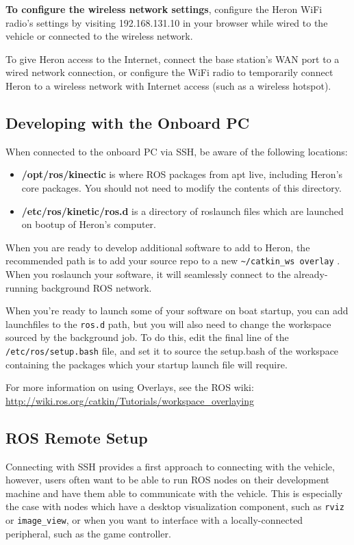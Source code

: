 \documentclass[]{clearpath-latex/clearpath-manual}
\begin{document}
\textbf{To configure the wireless network settings}, configure the Heron WiFi radio's settings by visiting 192.168.131.10 in your browser while wired to the vehicle or connected to the wireless network. 


To give Heron access to the Internet, connect the base station’s WAN port to a wired network connection, or configure the WiFi radio to temporarily connect Heron to a wireless network with Internet access (such as a wireless hotspot).

\subsection{Developing with the Onboard PC}
When connected to the onboard PC via SSH, be aware of the following locations:

\begin{itemize}[nolistsep]
	\item \textbf{/opt/ros/kinectic} is where ROS packages from apt live, including Heron’s core packages. You should not need to modify the contents of this directory.
	\item \textbf{/etc/ros/kinetic/ros.d} is a directory of roslaunch files which are launched on bootup of Heron's computer.
\end{itemize}

When you are ready to develop additional software to add to Heron, the recommended path is to add your source repo to a new \lstinline{~/catkin_ws overlay} . When you roslaunch your software, it will seamlessly connect to the already-running background ROS network.

When you’re ready to launch some of your software on boat startup, you can add launchfiles to the \lstinline{ros.d} path, but you will also need to change the workspace sourced by the background job. To do this, edit the final line of the \lstinline{/etc/ros/setup.bash} file, and set it to source the setup.bash of the workspace containing the packages which your startup launch file will require.

For more information on using Overlays, see the ROS wiki: \url{http://wiki.ros.org/catkin/Tutorials/workspace_overlaying}

\subsection{ROS Remote Setup}
Connecting with SSH provides a first approach to connecting with the vehicle, however, users often want to be able to run ROS nodes on their development machine and have them able to communicate with the vehicle. This is especially the case with nodes which have a desktop visualization component, such as \lstinline{rviz} or \lstinline{image_view}, or when you want to interface with a locally-connected peripheral, such as the game controller.
\end{document}
